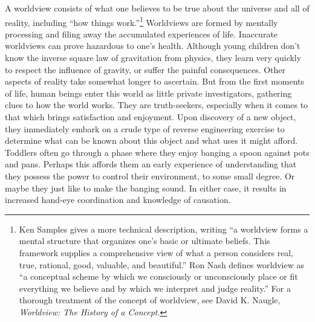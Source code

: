 A worldview consists of what one believes to be true about the universe
and all of reality, including “how things work.”\footnote{Ken Samples gives a more technical description,
writing “a worldview forms a mental structure that organizes one’s
basic or ultimate beliefs. This framework supplies a comprehensive view
of what a person considers real, true, rational, good, valuable, and
beautiful.”\citep{samples2007} 
Ron Nash defines worldview as “a conceptual scheme by
which we consciously or unconsciously place or fit everything we
believe and by which we interpret and judge reality.”\citep[][pg. 24]{nash1988} 
For a thorough treatment of the concept
of worldview, see David K. Naugle, \textit{Worldview: The History of a
Concept}.\citep{naugle2002}
} 
Worldviews are formed by mentally processing and filing away the
accumulated experiences of life. Inaccurate worldviews can prove
hazardous to one’s health. Although young children don’t know the
inverse square law of gravitation from physics, they learn very quickly
to respect the influence of gravity, or suffer the painful
consequences. Other aspects of reality take somewhat longer to
ascertain. But from the first moments of life, human beings enter this
world as little private investigators, gathering clues to how the world
works. They are truth-seekers, especially when it comes to that which
brings satisfaction and enjoyment. Upon discovery of a new object, they
immediately embark on a crude type of reverse engineering exercise to
determine what can be known about this object and what uses it might
afford. Toddlers often go through a phase where they enjoy banging a
spoon against pots and pans. Perhaps this affords them an early
experience of understanding that they possess the power to control
their environment, to some small degree. Or maybe they just like to
make the banging sound. In either case, it results in increased
hand-eye coordination and knowledge of causation.

